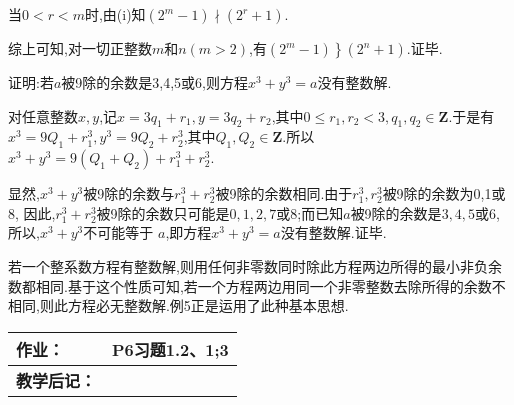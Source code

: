 当$0<r<m$时,由(i)知$\left(2^{m}-1\right)\nmid\left(2^{r}+1\right)$.

综上可知,对一切正整数$m$和$n(m>2)$,有$\left.\left(2^{m}-1\right)\right\}\left(2^{n}+1\right)$.证毕.

\example 证明:若$a$被9除的余数是3,4,5或6,则方程$x^{3}+y^{3}=a$没有整数解.

\proof 对任意整数$x, y$,记$x=3 q_{1}+r_{1}, y=3 q_{2}+r_{2}$,其中$0 \leqslant r_{1}, r_{2}<3, q_{1}, q_{2} \in \mathbf{Z}$.于是有$x^{3}=9 Q_{1}+r_{1}^{3}, y^{3}=9 Q_{2}+r_{2}^{3}$,其中$Q_{1}, Q_{2} \in \mathbf{Z}$.所以 $x^{3}+y^{3}=9\left(Q_{1}+Q_{2}\right)+r_{1}^{3}+r_{2}^{3}$.

显然,$x^{3}+y^{3}$被9除的余数与$r_{1}^{3}+r_{2}^{3}$被9除的余数相同.由于$r_{1}^{3}, r_{2}^{3}$被9除的余数为0,1或8, 因此,$r_{1}^{3}+r_{2}^{3}$被9除的余数只可能是$0,1,2,7$或8;而已知$a$被9除的余数是$3,4,5$或6,所以,$x^{3}+y^{3}$不可能等于 $a$,即方程$x^{3}+y^{3}=a$没有整数解.证毕.

\remark 若一个整系数方程有整数解,则用任何非零数同时除此方程两边所得的最小非负余数都相同.基于这个性质可知,若一个方程两边用同一个非零整数去除所得的余数不相同,则此方程必无整数解.例5正是运用了此种基本思想.

\begin{table}[htb]
	\centering  
	\begin{tabular}{p{22mm}|p{105.6mm}}
		\hline 
		\textbf{作业：}      & P6习题1.2、1;3  \\ \hline
		\textbf{教学后记：}  & \vspace{4ex} \\ \hline
	\end{tabular}
\end{table}